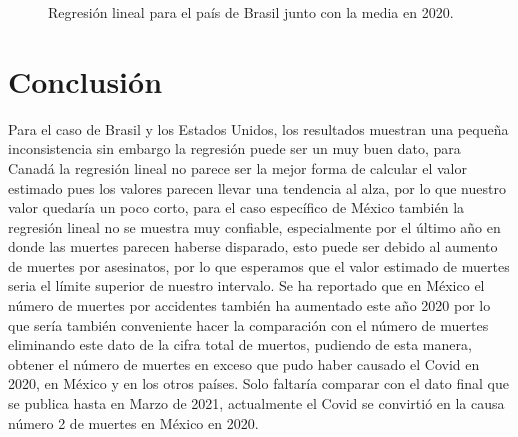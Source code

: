 \documentclass[12pt]{article}
\begin{document}
\begin{figure}[H]
\centering
{}%
\hfill
{}%
\hfill
\caption{Regresión lineal para el país de Brasil junto con la media en 2020.}

\label{fig:RegresionBrasil}
\end{figure}   
\hfill


\section{Conclusión}

Para el caso de Brasil y los Estados Unidos, los resultados muestran una pequeña inconsistencia sin embargo la regresión puede ser un muy buen dato, para Canadá la regresión lineal no parece ser la mejor forma de calcular el valor estimado pues los valores parecen llevar una tendencia al alza, por lo que nuestro valor quedaría un poco corto, para el caso específico de México también la regresión lineal no se muestra muy confiable, especialmente por el último año en donde las muertes parecen haberse disparado, esto puede ser debido al aumento de muertes por asesinatos, por lo que esperamos que el valor estimado de muertes seria el límite superior de nuestro intervalo. Se ha reportado que en México el número de muertes por accidentes también ha aumentado este año 2020 por lo que sería también conveniente hacer la comparación con el número de muertes eliminando este dato de la cifra total de muertos, pudiendo de esta manera, obtener el número de muertes en exceso que pudo haber causado el Covid en 2020, en México y en los otros países.
Solo faltaría comparar con el dato final que se publica hasta en Marzo de 2021, actualmente el Covid se convirtió en la causa número 2 de muertes en México en 2020.

\printbibliography[title={Referencias}]
\end{document}
